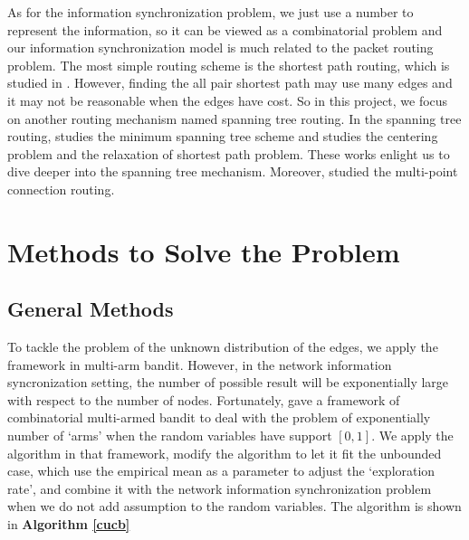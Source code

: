 \documentclass{article}
\theoremstyle{plain}
\theoremstyle{definition}
\theoremstyle{remark}
\begin{document}
    As for the information synchronization problem, we just use a number to represent the information, so it can be viewed as a combinatorial problem and our information synchronization model is much related to the packet routing problem. The most simple routing scheme is the shortest path routing, which is studied in \citet{ahn2002genetic,wang1992analysis}. However, finding the all pair shortest path may use many edges and it may not be reasonable when the edges have cost. So in this project, we focus on another routing mechanism named spanning tree routing. In the spanning tree routing, \citet{huang2006dynamic} studies the minimum spanning tree scheme and \citet{christofides1981exact} studies the centering problem and the relaxation of shortest path problem. These works enlight us to dive deeper into the spanning tree mechanism. Moreover, \cite{waxman1988routing} studied the multi-point connection routing. 

    \section{Methods to Solve the Problem}
    \subsection{General Methods}
    To tackle the problem of the unknown distribution of the edges, we apply the framework in multi-arm bandit. However, in the network information syncronization setting, the number of possible result will be exponentially large with respect to the number of nodes. Fortunately, \citet{pmlr-v28-chen13a} gave a framework of combinatorial multi-armed bandit to deal with the problem of exponentially number of `arms' when the random variables have support $[0,1]$. We apply the algorithm in that framework, modify the algorithm to let it fit the unbounded case, which use the empirical mean as a parameter to adjust the `exploration rate', and combine it with the network information synchronization problem when we do not add assumption to the random variables. The algorithm is shown in \textbf{Algorithm \ref{cucb}}
\end{document}

